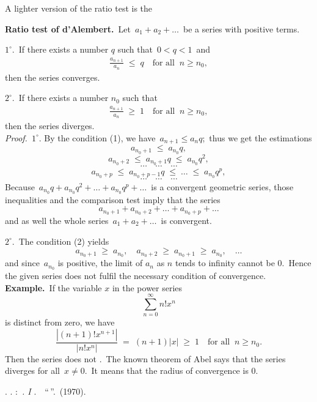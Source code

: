 \documentclass[12pt]{article}
\begin{document}
A lighter version of the ratio test is the

\textbf{Ratio test of d'Alembert.}\, Let\, $a_1\!+\!a_2\!+\ldots$\, be a series with positive terms.

$1^\circ$.\, If there exists a number $q$ such that\, $0 < q < 1$\, and
\begin{align}
\frac{a_{n+1}}{a_n} \;\le\; q \quad \mbox{for all}\;\; n \ge n_0,
\end{align}
then the series converges.

$2^\circ$.\, If there exists a number $n_0$ such that
\begin{align}
\frac{a_{n+1}}{a_n} \;\ge\; 1 \quad \mbox{for all}\;\; n \ge n_0,
\end{align}
then the series diverges.\\


\emph{Proof.}\, $1^\circ$. By the condition (1), we have\, $a_{n+1} \le a_nq$;\, thus we get the estimations
$$a_{n_0+1} \;\le\; a_{n_0}q,$$
$$a_{n_0+2} \;\le\; a_{n_0+1}q \;\le\; a_{n_0}q^2,$$
$$\cdots \quad \cdots \quad \cdots$$
$$a_{n_0+p} \;\le\; a_{n_0+p-1}q \;\le\; \ldots \;\le\; a_{n_0}q^p,$$
$$\cdots \quad \cdots \quad \cdots$$
Because\, $a_{n_0}q+a_{n_0}q^2+\ldots+a_{n_0}q^p+\ldots$\, is a convergent geometric series, those inequalities and the comparison test imply that the series
$$a_{n_0+1}\!+\!a_{n_0+2}\!+\ldots+\!a_{n_0+p}\!+\ldots$$
and as well the whole series\, $a_1\!+\!a_2\!+\ldots$\, is convergent.

$2^\circ$.\, The condition (2) yields
$$a_{n_0+1} \;\ge\; a_{n_0}, \quad a_{n_0+2} \;\ge\; a_{n_0+1} \;\ge\; a_{n_0}, \quad \ldots$$
and since\, $a_{n_0}$ is positive, the limit of $a_n$ as $n$ tends to infinity cannot be 0.\, Hence the given series does not fulfil the necessary condition of convergence.\\

\textbf{Example.}\, If the variable $x$ in the power series
$$\sum_{n=0}^\infty n!x^n$$
is distinct from zero, we have
$$\frac{|(n\!+\!1)!x^{n+1}|}{|n!x^n|} \;=\; (n\!+\!1)|x| \;\ge\; 1 \quad \mbox{for all}\;\; n \ge n_0.$$
Then the series does not .\, The known theorem of Abel says that the series diverges for all\, 
$x \neq 0$.\, It means that the radius of convergence is 0.



\begin{thebibliography}{7}
 \CYRL. \CYRD. \CYRK\cyru\cyrd\cyrr\cyrya\cyrv\cyrc\cyre\cyrv: 
{\em \CYRM\cyra\cyrt\cyre\cyrm\cyra\cyrt\cyri\cyrch\cyre\cyrs\cyrk\cyri\cyrishrt \,\cyra\cyrn\cyra\cyrl\cyri\cyrz. I \cyrt\cyro\cyrm}. \,\CYRI\cyrz\cyrd\cyra\cyrt\cyre\cyrl\cyrsftsn\cyrs\cyrt\cyrv\cyro \,
``\CYRV\cyrery\cyrs\cyrsh\cyra\cyrya \,\cyrsh\cyrk\cyro\cyrl\cyra''. \CYRM\cyro\cyrs\cyrk\cyrv\cyra \,(1970).
\end{thebibliography}








\end{document}
